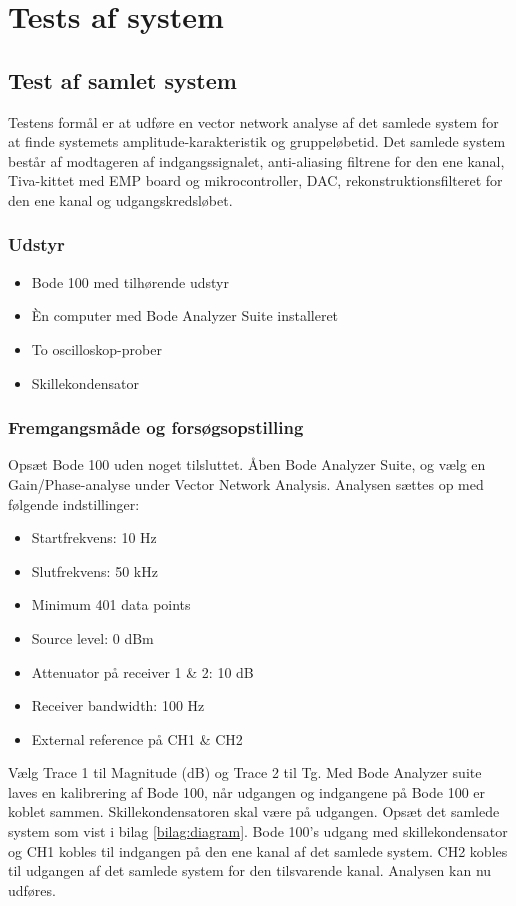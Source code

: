 \chapter{Tests af system}
\label{bilag:test}
\section{Test af samlet system}
\label{sec:test_samlet}
Testens formål er at udføre en vector network analyse af det samlede system for at finde systemets amplitude-karakteristik og gruppeløbetid. 
Det samlede system består af modtageren af indgangssignalet, anti-aliasing filtrene for den ene kanal, Tiva-kittet med EMP board og mikrocontroller, DAC, rekonstruktionsfilteret for den ene kanal og udgangskredsløbet. 

\subsection{Udstyr}
\begin{itemize}
	\item Bode 100 med tilhørende udstyr
	\item Èn computer med Bode Analyzer Suite installeret
	\item To oscilloskop-prober
	\item Skillekondensator
\end{itemize}

\subsection{Fremgangsmåde og forsøgsopstilling}
Opsæt Bode 100 uden noget tilsluttet. 
Åben Bode Analyzer Suite, og vælg en Gain/Phase-analyse under Vector Network Analysis. 
Analysen sættes op med følgende indstillinger:
\begin{multicols}{2}
\begin{itemize}
	\item Startfrekvens: 10 Hz
	\item Slutfrekvens: 50 kHz
	\item Minimum 401 data points
	\item Source level: 0 dBm
	\item Attenuator på receiver 1 \& 2: 10 dB
	\item Receiver bandwidth: 100 Hz
	\item External reference på CH1 \& CH2
\end{itemize}
\end{multicols}
Vælg Trace 1 til Magnitude (dB) og Trace 2 til Tg. \newline
Med Bode Analyzer suite laves en kalibrering af Bode 100, når udgangen og indgangene på Bode 100 er koblet sammen. 
Skillekondensatoren skal være på udgangen. \newline
Opsæt det samlede system som vist i bilag \ref{bilag:diagram}. 
Bode 100's udgang med skillekondensator og CH1 kobles til indgangen på den ene kanal af det samlede system. 
CH2 kobles til udgangen af det samlede system for den tilsvarende kanal. 
Analysen kan nu udføres. 

